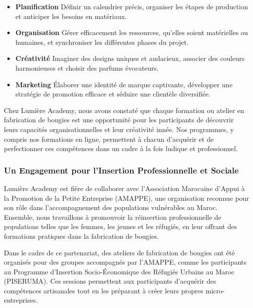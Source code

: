 \documentclass[11pt,fleqn,onecolumn,oneside]{book}
\begin{document}
\begin{itemize}
    \item \textbf{Planification} Définir un calendrier précis, organiser les étapes de production et anticiper les besoins en matériaux.
    \item \textbf{Organisation} Gérer efficacement les ressources, qu’elles soient matérielles ou humaines, et synchroniser les différentes phases du projet.
    \item \textbf{Créativité} Imaginer des designs uniques et audacieux, associer des couleurs harmonieuses et choisir des parfums évocateurs.
    \item \textbf{Marketing} Élaborer une identité de marque captivante, développer une stratégie de promotion efficace et séduire une clientèle diversifiée.
\end{itemize}

\begin{remark}
Chez Lumière Academy, nous avons constaté que chaque formation ou atelier en fabrication de bougies est une opportunité pour les participants de découvrir leurs capacités organisationnelles et leur créativité innée. Nos programmes, y compris nos formations en ligne, permettent à chacun d’acquérir et de perfectionner ces compétences dans un cadre à la fois ludique et professionnel.
\end{remark}

\subsubsection*{Un Engagement pour l’Insertion Professionnelle et Sociale}

Lumière Academy est fière de collaborer avec l’Association Marocaine d’Appui à la Promotion de la Petite Entreprise (AMAPPE), une organisation reconnue pour son rôle dans l’accompagnement des populations vulnérables au Maroc. Ensemble, nous travaillons à promouvoir la réinsertion professionnelle de populations telles que les femmes, les jeunes et les réfugiés, en leur offrant des formations pratiques dans la fabrication de bougies.

\begin{example}
Dans le cadre de ce partenariat, des ateliers de fabrication de bougies ont été organisés pour des groupes accompagnés par l’AMAPPE, comme les participants au Programme d’Insertion Socio-Économique des Réfugiés Urbains au Maroc (PISERUMA). Ces sessions permettent aux participants d’acquérir des compétences artisanales tout en les préparant à créer leurs propres micro-entreprises.
\end{example}
\end{document}
